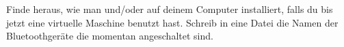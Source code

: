 \begin{aufg}
  Finde heraus, wie man \PythonZwei und/oder \PythonDrei auf deinem Computer installiert, falls du bis jetzt eine virtuelle Maschine benutzt hast.
  Schreib in eine Datei die Namen der Bluetoothgeräte die momentan angeschaltet sind.
\end{aufg}
